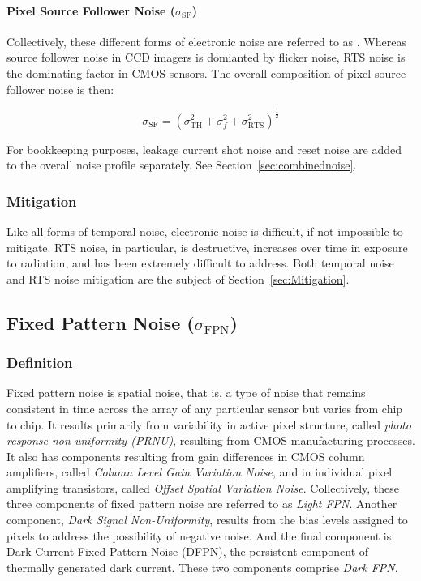 \documentclass[10pt]{article}
\begin{document}
\paragraph{Pixel Source Follower Noise (\boldmath $\sigma_{\text{SF}}$)}

Collectively, these different forms of electronic noise are referred to as . Whereas source follower noise in CCD imagers is domianted by flicker noise, RTS noise is the dominating factor in CMOS sensors. The overall composition of pixel source follower noise is then:

$$ \sigma_{\text{SF}} = (\sigma^2_{\text{TH}} + \sigma^2_f + \sigma^2_{\text{RTS}})^{\frac{1}{2}}$$

\vspace{2mm}

For bookkeeping purposes, leakage current shot noise and reset noise are added to the overall noise profile separately. See Section~\ref{sec:combinednoise}.

\subsubsection{Mitigation}
 
Like all forms of temporal noise, electronic noise is difficult, if not impossible to mitigate. RTS noise, in particular, is destructive, increases over time in exposure to radiation, and has been extremely difficult to address. Both temporal noise and RTS noise mitigation are the subject of Section~\ref{sec:Mitigation}.

\subsection{Fixed Pattern Noise (\boldmath $\sigma_{\text{FPN}}$)}
\label{sec:FPN}

\subsubsection{Definition}

Fixed pattern noise is spatial noise, that is, a type of noise that remains consistent in time across the array of any particular sensor but varies from chip to chip. It results primarily from variability in active pixel structure, called \emph{photo response non-uniformity (PRNU)}, resulting from CMOS manufacturing processes. It also has components resulting from gain differences in CMOS column amplifiers, called \emph{Column Level Gain Variation Noise}, and in individual pixel amplifying transistors, called \emph{Offset Spatial Variation Noise}. Collectively, these three components of fixed pattern noise are referred to as \emph{Light FPN}. Another component, \emph{Dark Signal Non-Uniformity}, results from the bias levels assigned to pixels to address the possibility of negative noise. And the final component is Dark Current Fixed Pattern Noise (DFPN), the persistent component of thermally generated dark current. These two components comprise \emph{Dark FPN}.
\end{document}
